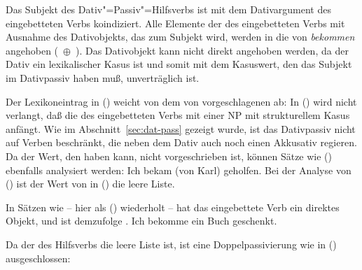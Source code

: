 \noindent
Das Subjekt des Dativ"=Passiv"=Hilfsverbs ist mit dem Dativargument des eingebetteten Verbs
koindiziert. Alle Elemente der \subcatl des eingebetteten Verbs mit Ausnahme des Dativobjekts, das
zum Subjekt wird, werden in die \subcatl von \emph{bekommen} angehoben (\, $\oplus$
\,). Das Dativobjekt kann nicht direkt angehoben werden, da der Dativ ein lexikalischer Kasus
ist und somit mit dem Kasuswert, den das Subjekt im Dativpassiv haben muß, unverträglich ist.

Der Lexikoneintrag in () weicht von dem von \citet[]{HM94a} vorgeschlagenen ab:
In () wird nicht verlangt, daß die \subcatl des eingebetteten Verbs mit einer NP mit strukturellem Kasus
anfängt. Wie im Abschnitt~\ref{sec:dat-pass} gezeigt wurde, ist das Dativpassiv nicht auf Verben
beschränkt, die neben dem Dativ auch noch einen Akkusativ regieren. Da der Wert, den  
haben kann, nicht vorgeschrieben ist, können Sätze wie () ebenfalls analysiert werden:
\ea{}
Ich bekam (von Karl) geholfen.
\z
Bei der Analyse von () ist der Wert von  in () die leere Liste.

In Sätzen wie  -- hier als () wiederholt -- 
hat das eingebettete Verb ein direktes Objekt, und  ist demzufolge .
\ea\label{ex-ich-bekommen-ein-buch-geschenkt-zwei} 
Ich     bekomme ein Buch       geschenkt.
\z

%

\noindent
Da der \daw des Hilfsverbs die leere Liste ist, ist eine Doppelpassivierung wie
in () ausgeschlossen:
\z

